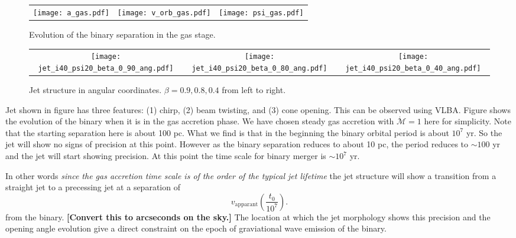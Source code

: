 \begin{figure*}
\begin{center}
  \begin{tabular}{ccc}
    \texttt{[image: a\_gas.pdf]} &
    \texttt{[image: v\_orb\_gas.pdf]} &
    \texttt{[image: psi\_gas.pdf]}
  \end{tabular}
\end{center}
\caption{Evolution of the binary separation in the gas stage.}
\label{fig:a_gas}
\end{figure*}

\begin{figure*}
\begin{center}
  \begin{tabular}{ccc}
    \texttt{[image: jet\_i40\_psi20\_beta\_0\_90\_ang.pdf]} &
    \texttt{[image: jet\_i40\_psi20\_beta\_0\_80\_ang.pdf]} &
    \texttt{[image: jet\_i40\_psi20\_beta\_0\_40\_ang.pdf]}
  \end{tabular}
\end{center}
\caption{Jet structure in angular coordinates. $\beta=0.9, 0.8, 0.4$ from left to right.}
\label{fig:ang}
\end{figure*}



Jet shown in figure has three features: (1) chirp, (2) beam twisting,
and (3) cone opening.  This can be observed using VLBA.  Figure shows
the evolution of the binary when it is in the gas accretion phase.  We
have chosen steady gas accretion with $\dot{\mathcal{M}}=1$ here for
simplicity.  Note that the starting separation here is about 100 pc.
What we find is that in the beginning the binary orbital period is
about $10^7$ yr. So the jet will show no signs of precision at this
point.  However as the binary separation reduces to about 10 pc, the
period reduces to $\sim 100$ yr and the jet will start showing
precision.  At this point the time scale for binary merger is $\sim
10^7$ yr.

In other words \emph{since the gas accretion time scale is of the
  order of the typical jet lifetime} the jet structure will show a
transition from a straight jet to a precessing jet at a separation of
\begin{equation}
  v_\mathrm{apparant}\left(\frac{t_0}{10^7}\right).
\end{equation}
from the binary.  \textbf{[Convert this to arcseconds on the sky.]}
The location at which the jet morphology shows this precision and the
opening angle evolution give a direct constraint on the epoch of
graviational wave emission of the binary.

